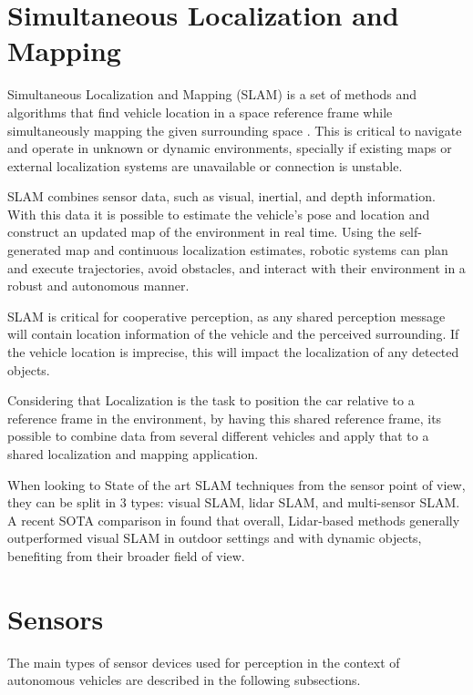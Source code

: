 \section{Simultaneous Localization and Mapping}

Simultaneous Localization and Mapping (SLAM) is a set of methods and algorithms that find vehicle location in a space reference frame while simultaneously mapping the given surrounding space \cite{Zheng2023}. This is critical to navigate and operate in unknown or dynamic environments, specially if existing maps or external localization systems are unavailable or connection is unstable.

SLAM combines sensor data, such as visual, inertial, and depth information. With this data it is possible to estimate the vehicle's pose and location and construct an updated map of the environment in real time. Using the self-generated map and continuous localization estimates, robotic systems can plan and execute trajectories, avoid obstacles, and interact with their environment in a robust and autonomous manner.

SLAM is critical for cooperative perception, as any shared perception message will contain location information of the vehicle and the perceived surrounding. If the vehicle location is imprecise, this will impact the localization of any detected objects.

Considering that Localization is the task to position the car relative to a reference frame in the environment, by having this shared reference frame, its possible to combine data from several different vehicles and apply that to a shared localization and mapping application.

When looking to State of the art SLAM techniques from the sensor point of view, they can be split in 3 types: visual SLAM, lidar SLAM, and multi-sensor SLAM. A recent SOTA comparison in \cite{garigipati2022} found that overall, Lidar-based methods generally outperformed visual SLAM in outdoor settings and with dynamic objects, benefiting from their broader field of view.

\section{Sensors}

The main types of sensor devices used for perception in the context of autonomous vehicles are described in the following subsections. 

